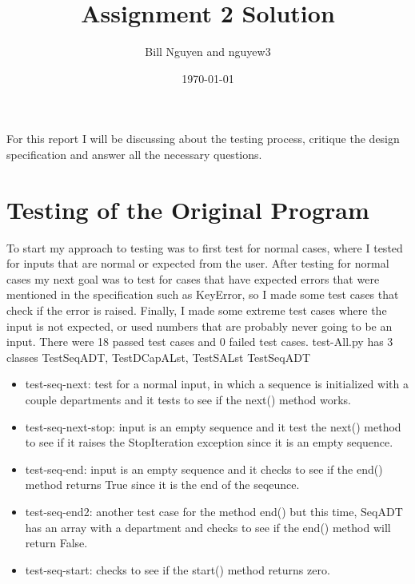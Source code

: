 \documentclass[12pt]{article}
\title{Assignment 2 Solution}
\author{Bill Nguyen and nguyew3}
\date{\today}
\begin{document}
\maketitle

For this report I will be discussing about the testing process, critique the design specification and answer all the necessary questions. 

\section{Testing of the Original Program}
To start my approach to testing was to first test for normal cases, where I tested for inputs that are normal or expected from the user. After testing for normal cases my next goal was to test for cases that have expected errors that were mentioned in the specification such as KeyError, so I made some test cases that check if the error is raised. Finally, I made some extreme test cases where the input is not expected, or used numbers that are probably never going to be an input. There were 18 passed test cases and 0 failed test cases.
\newline
\newline
test-All.py has 3 classes TestSeqADT, TestDCapALst, TestSALst
\newline
\newline
TestSeqADT
\begin{itemize}
	\item test-seq-next: test for a normal input, in which a sequence is initialized with a couple departments and it tests to see if the next() method works.
	\item test-seq-next-stop: input is an empty sequence and it test the next() method to see if it raises the StopIteration exception since it is an empty sequence.
	\item test-seq-end: input is an empty sequence and it checks to see if the end() method returns True since it is the end of the seqeunce.
	\item test-seq-end2: another test case for the method end() but this time, SeqADT has an array with a department and checks to see if the end() method will return False.
	\item test-seq-start: checks to see if the start() method returns zero.
\end{itemize}
\end{document}
